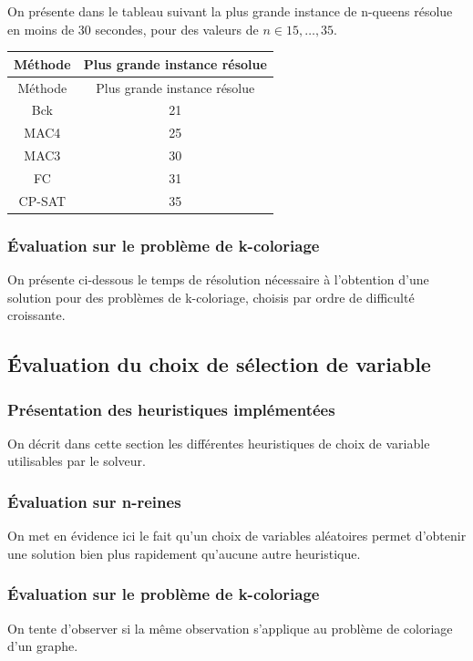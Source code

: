 \documentclass[14pt]{article}
\begin{document}
On présente dans le tableau suivant la plus grande instance de n-queens résolue en moins de 30 secondes, pour des valeurs de $n \in {15,\dots,35}$.

\begin{longtable}{|c|c|}
	\hline
	Méthode & Plus grande instance résolue \\
	\hline
	\endfirsthead
	
	Méthode & Plus grande instance résolue \\
	\hline
	\endhead
	
	\hline
	\endfoot
	
	\hline
	\endlastfoot
	
	Bck  & 21 \\
	MAC4  & 25 \\
	MAC3  & 30 \\
	FC  & 31 \\
	CP-SAT  & 35 \\
\end{longtable}


\subsubsection{Évaluation sur le problème de k-coloriage}

On présente ci-dessous le temps de résolution nécessaire à l'obtention d'une solution pour des problèmes de k-coloriage, choisis par ordre de difficulté croissante.

\subsection{Évaluation du choix de sélection de variable}

\subsubsection{Présentation des heuristiques implémentées}

On décrit dans cette section les différentes heuristiques de choix de variable utilisables par le solveur.

\subsubsection{Évaluation sur n-reines}

On met en évidence ici le fait qu'un choix de variables aléatoires permet d'obtenir une solution bien plus rapidement qu'aucune autre heuristique.

\subsubsection{Évaluation sur le problème de k-coloriage}

On tente d'observer si la même observation s'applique au problème de coloriage d'un graphe.

\end{document}
